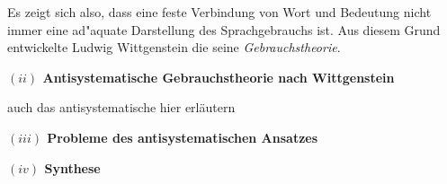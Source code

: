 \documentclass[a4paper, emulatestandardclasses, 12pt]{scrartcl}
\begin{document}
\begin{onehalfspace}
Es zeigt sich also, dass eine feste Verbindung von Wort und Bedeutung nicht immer eine ad"aquate Darstellung des Sprachgebrauchs ist. Aus diesem Grund entwickelte Ludwig Wittgenstein die seine \emph{Gebrauchstheorie}.

\newpage %
\noindent\textbf{$(ii)$ Antisystematische Gebrauchstheorie nach Wittgenstein}	

\noindent auch das antisystematische hier erläutern

\vspace{5mm}
\noindent\textbf{$(iii)$ Probleme des antisystematischen Ansatzes}	

\noindent 

\vspace{5mm}
\noindent\textbf{$(iv)$ Synthese}	

\noindent 

\end{onehalfspace}


\end{document}
